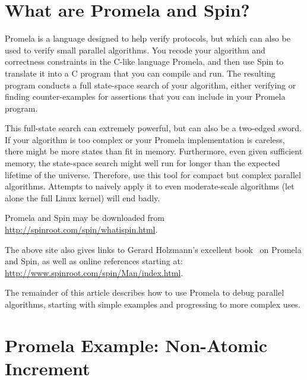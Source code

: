 
\section{What are Promela and Spin?}
\label{app:formal:What are Promela and Spin?}

Promela is a language designed to help verify protocols, but which
can also be used to verify small parallel algorithms.
You recode your algorithm and correctness constraints in the C-like
language Promela, and then use Spin to translate it into a C program
that you can compile and run.
The resulting program conducts a full state-space search of your
algorithm, either verifying or finding counter-examples for
assertions that you can include in your Promela program.

This full-state search can extremely powerful, but can also be a two-edged
sword.
If your algorithm is too complex or your Promela implementation is
careless, there might be more states than fit in memory.
Furthermore, even given sufficient memory, the state-space search might
well run for longer than the expected lifetime of the universe.
Therefore, use this tool for compact but complex parallel algorithms.
Attempts to naively apply it to even moderate-scale algorithms (let alone
the full Linux kernel) will end badly.

Promela and Spin may be downloaded from
\url{http://spinroot.com/spin/whatispin.html}.

The above site also gives links to Gerard Holzmann's excellent
book~\cite{Holzmann03a} on Promela and Spin,
as well as online references starting at:
\url{http://www.spinroot.com/spin/Man/index.html}.

The remainder of this article describes how to use Promela to debug
parallel algorithms, starting with simple examples and progressing to
more complex uses.

\section{Promela Example: Non-Atomic Increment}
\label{app:formal:Promela Example: Non-Atomic Increment}

